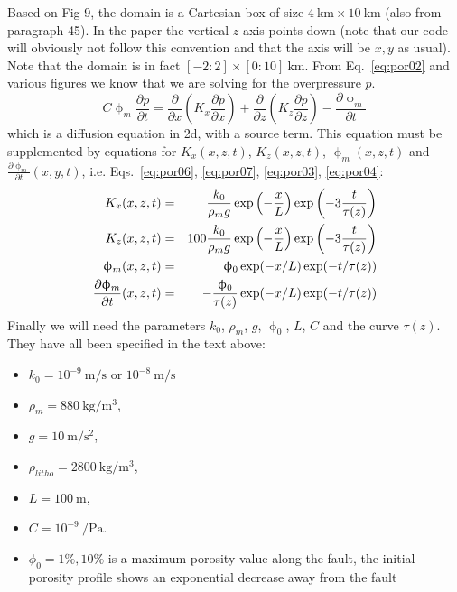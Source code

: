 Based on Fig 9, the domain is a Cartesian box of size $4~\si{\km} \times 10~\si{\km}$ (also from paragraph 45). In the paper the vertical $z$ axis points down (note that our code will obviously 
not follow this convention and that the axis will be $x,y$ as usual). 
Note that the domain is in fact $[-2:2]\times[0:10]~\si{\km}$. 
From Eq.~\eqref{eq:por02} and various figures we know that we are solving for the overpressure $p$. 
\[
C \upphi_m \frac{\partial p}{\partial t} 
=\frac{\partial}{\partial x} \left( K_x \frac{\partial p}{\partial x} \right) 
+ \frac{\partial}{\partial z} \left( K_z \frac{\partial p}{\partial z} \right)
- \frac{\partial \upphi_m}{\partial t} 
\]
which is a diffusion equation in 2d, with a source term. 
This equation must be supplemented by equations for $K_x(x,z,t)$, $K_z(x,z,t)$, $\upphi_m(x,z,t)$ and 
$\frac{\partial \upphi_m}{\partial t} (x,y,t)$, i.e. Eqs.~\eqref{eq:por06}, \eqref{eq:por07}, \eqref{eq:por03}, \eqref{eq:por04}:
\begin{eqnarray}
K_x(x,z,t) &=& \frac{k_0 }{\rho_m g}  \exp\left(-\frac{x}{L}\right) \exp\left(-3\frac{t}{\tau(z)}\right) \nonumber\\
K_z(x,z,t) &=& 100\frac{k_0 }{\rho_m g}  \exp\left(-\frac{x}{L}\right) \exp\left(-3\frac{t}{\tau(z)}\right) \nonumber\\
\upphi_m(x,z,t) &=& \upphi_0 \exp (-x/L) \exp (-t/\tau(z)) \nonumber\\
\frac{\partial \upphi_m}{\partial t}(x,z,t) &=& -\frac{\upphi_0}{\tau(z)} \exp (-x/L) \exp (-t/\tau(z)) \nonumber
\end{eqnarray}
Finally we will need the parameters $k_0$, $\rho_m$, $g$, $\upphi_0$, $L$, $C$ and the curve $\tau(z)$.
They have all been specified in the text above:

\begin{itemize}
\item $k_0 = 10^{-9}~\si{\meter\per\second}$ or $10^{-8}~\si{\meter\per\second}$
\item $\rho_m=880~\si{\kg\per\cubic\meter}$, 
\item $g=10~\si{\meter\per\square\second}$, 
\item $\rho_{litho}=2800~\si{\kg\per\cubic\meter}$, 
\item $L=100~\si{\meter}$, 
\item $C=10^{-9}~\si{\per\pascal}$.
\item $\phi_0=1\%,10\%$ is a maximum porosity value along the fault, the initial porosity profile shows an
exponential decrease away from the fault
\end{itemize}

